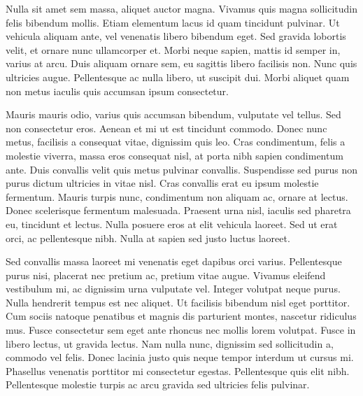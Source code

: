 Nulla sit amet sem massa, aliquet auctor magna. Vivamus quis magna sollicitudin felis bibendum mollis. Etiam elementum lacus id quam tincidunt pulvinar. Ut vehicula aliquam ante, vel venenatis libero bibendum eget. Sed gravida lobortis velit, et ornare nunc ullamcorper et. Morbi neque sapien, mattis id semper in, varius at arcu. Duis aliquam ornare sem, eu sagittis libero facilisis non. Nunc quis ultricies augue. Pellentesque ac nulla libero, ut suscipit dui. Morbi aliquet quam non metus iaculis quis accumsan ipsum consectetur.

Mauris mauris odio, varius quis accumsan bibendum, vulputate vel tellus. Sed non consectetur eros. Aenean et mi ut est tincidunt commodo. Donec nunc metus, facilisis a consequat vitae, dignissim quis leo. Cras condimentum, felis a molestie viverra, massa eros consequat nisl, at porta nibh sapien condimentum ante. Duis convallis velit quis metus pulvinar convallis. Suspendisse sed purus non purus dictum ultricies in vitae nisl. Cras convallis erat eu ipsum molestie fermentum. Mauris turpis nunc, condimentum non aliquam ac, ornare at lectus. Donec scelerisque fermentum malesuada. Praesent urna nisl, iaculis sed pharetra eu, tincidunt et lectus. Nulla posuere eros at elit vehicula laoreet. Sed ut erat orci, ac pellentesque nibh. Nulla at sapien sed justo luctus laoreet.

Sed convallis massa laoreet mi venenatis eget dapibus orci varius. Pellentesque purus nisi, placerat nec pretium ac, pretium vitae augue. Vivamus eleifend vestibulum mi, ac dignissim urna vulputate vel. Integer volutpat neque purus. Nulla hendrerit tempus est nec aliquet. Ut facilisis bibendum nisl eget porttitor. Cum sociis natoque penatibus et magnis dis parturient montes, nascetur ridiculus mus. Fusce consectetur sem eget ante rhoncus nec mollis lorem volutpat. Fusce in libero lectus, ut gravida lectus. Nam nulla nunc, dignissim sed sollicitudin a, commodo vel felis. Donec lacinia justo quis neque tempor interdum ut cursus mi. Phasellus venenatis porttitor mi consectetur egestas. Pellentesque quis elit nibh. Pellentesque molestie turpis ac arcu gravida sed ultricies felis pulvinar.
